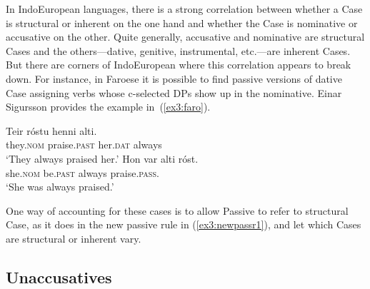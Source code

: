 In IndoEuropean languages, there is a strong correlation between whether a Case is structural or inherent on the one hand and whether the Case is nominative or accusative on the other. Quite generally, accusative and nominative are structural Cases and the others---dative, genitive, instrumental, etc.---are inherent Cases. But there are corners of IndoEuropean where this correlation appears to break down. For instance, in Faroese it is possible to find passive versions of dative Case assigning verbs whose c-selected DPs show up in the nominative. Einar Sigur\dh sson provides the example in~(\ref{ex3:faro}).
\begin{exe}
	\raggedright
	\ex \label{ex3:faro} 
	\begin{xlist}
		\ex \gll Teir r\'ostu henni alti\dh. \\ they.\textsc{nom} praise.\textsc{past} her.\textsc{dat} always \\ `They always praised her.'
		\ex \gll Hon {var\dh} {alti\dh} r\'ost. \\ she.\textsc{nom} be.\textsc{past} always praise.\textsc{pass}. \\ `She was always praised.'
	\end{xlist}
\end{exe}
One way of accounting for these cases is to allow Passive to refer to structural Case, as it does in the new passive rule in (\ref{ex3:newpassr1}), and let which Cases are structural or inherent vary.

\subsection{Unaccusatives}

